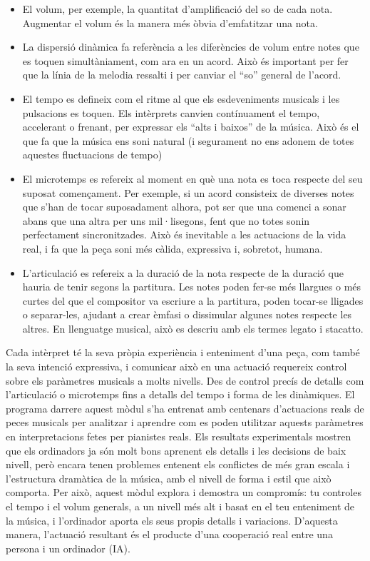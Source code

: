 \begin{itemize}
\item El volum, per exemple, la quantitat d'amplificació del so de cada nota. Augmentar el volum és la manera més òbvia d'emfatitzar una nota.

\item La dispersió dinàmica fa referència a les diferències de volum entre notes que es toquen simultàniament, com ara en un acord. Això és important per fer que la línia de la melodia ressalti i per canviar el ``so'' general de l'acord.

\item El tempo es defineix com el ritme al que els esdeveniments musicals i les pulsacions es toquen. Els intèrprets canvien contínuament el tempo, accelerant o frenant, per expressar els ``alts i baixos'' de la música. Això és el que fa que la música ens soni natural (i segurament no ens adonem de totes aquestes fluctuacions de tempo)

\item El microtemps es refereix al moment en què una nota es toca respecte del seu suposat començament. Per exemple, si un acord consisteix de diverses notes que s'han de tocar suposadament alhora, pot ser que una comenci a sonar abans que una altra per uns mil·lisegons, fent que no totes sonin perfectament sincronitzades. Això és inevitable a les actuacions de la vida real, i fa que la peça soni més càlida, expressiva i, sobretot, humana.


\item L'articulació es refereix a la duració de la nota respecte de la duració que hauria de tenir segons la partitura. Les notes poden fer-se més llargues o més curtes del que el compositor va escriure a la partitura, poden tocar-se lligades o separar-les, ajudant a crear èmfasi o dissimular algunes notes respecte les altres. En llenguatge musical, això es descriu amb els termes legato i stacatto.
\end{itemize}

Cada intèrpret té la seva pròpia experiència i enteniment d'una peça, com també la seva intenció expressiva, i comunicar això en una actuació requereix control sobre els paràmetres musicals a molts nivells. Des de control precís de detalls com l'articulació o microtemps fins a detalls del tempo i forma de les dinàmiques. El programa darrere aquest mòdul s'ha entrenat amb centenars d'actuacions reals de peces musicals per analitzar i aprendre com es poden utilitzar aquests paràmetres en interpretacions fetes per pianistes reals. Els resultats experimentals mostren que els ordinadors ja són molt bons aprenent els detalls i les decisions de baix nivell, però encara tenen problemes entenent els conflictes de més gran escala i l'estructura dramàtica de la música, amb el nivell de forma i estil que això comporta. Per això, aquest mòdul explora i demostra un compromís: tu controles el tempo i el volum generals, a un nivell més alt i basat en el teu enteniment de la música, i l'ordinador aporta els seus propis detalls i variacions. D'aquesta manera, l'actuació resultant és el producte d'una cooperació real entre una persona i un ordinador (IA).

